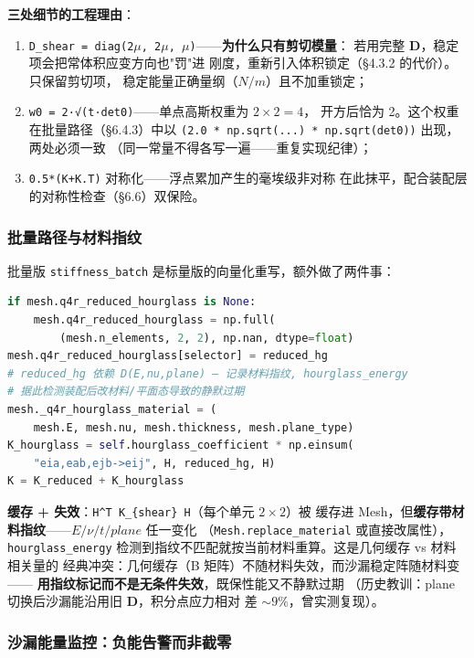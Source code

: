 \documentclass[12pt,a4paper]{ctexart}
\newcommand{\fem}{\Verb}
\begin{document}
\textbf{三处细节的工程理由}：

\begin{enumerate}[leftmargin=*]
  \item \texttt{D\_shear = diag(2$\mu$, 2$\mu$, $\mu$)}——\textbf{为什么只有剪切模量}：
        若用完整 $\mathbf{D}$，稳定项会把常体积应变方向也"罚"进
        刚度，重新引入体积锁定（§4.3.2 的代价）。只保留剪切项，
        稳定能量正确量纲（$N/m$）且不加重锁定；
  \item \fem|w0 = 2·√(t·det0)|——单点高斯权重为 $2\times2=4$，
        开方后恰为 2。这个权重在批量路径（§6.4.3）中以
        \fem|(2.0 * np.sqrt(...) * np.sqrt(det0))| 出现，两处必须一致
        （同一常量不得各写一遍——重复实现纪律）；
  \item \fem|0.5*(K+K.T)| 对称化——浮点累加产生的毫埃级非对称
        在此抹平，配合装配层的对称性检查（§6.6）双保险。
\end{enumerate}

\subsubsection{批量路径与材料指纹}

批量版 \fem|stiffness_batch| 是标量版的向量化重写，额外做了两件事：

\begin{lstlisting}[language=python]
if mesh.q4r_reduced_hourglass is None:
    mesh.q4r_reduced_hourglass = np.full(
        (mesh.n_elements, 2, 2), np.nan, dtype=float)
mesh.q4r_reduced_hourglass[selector] = reduced_hg
# reduced_hg 依赖 D(E,nu,plane) — 记录材料指纹, hourglass_energy
# 据此检测装配后改材料/平面态导致的静默过期
mesh._q4r_hourglass_material = (
    mesh.E, mesh.nu, mesh.thickness, mesh.plane_type)
K_hourglass = self.hourglass_coefficient * np.einsum(
    "eia,eab,ejb->eij", H, reduced_hg, H)
K = K_reduced + K_hourglass
\end{lstlisting}

\textbf{缓存 + 失效}：\fem|H^T K_{shear} H|（每个单元 $2\times2$）被
缓存进 Mesh，但\textbf{缓存带材料指纹}——$E/\nu/t/plane$ 任一变化
（\fem|Mesh.replace_material| 或直接改属性），\fem|hourglass_energy|
检测到指纹不匹配就按当前材料重算。这是几何缓存 vs 材料相关量的
经典冲突：几何缓存（B 矩阵）不随材料失效，而沙漏稳定阵随材料变——
\textbf{用指纹标记而不是无条件失效}，既保性能又不静默过期
（历史教训：plane 切换后沙漏能沿用旧 $\mathbf{D}$，积分点应力相对
差 $\sim 9\%$，曾实测复现）。

\subsubsection{沙漏能量监控：负能告警而非截零}
\end{document}
